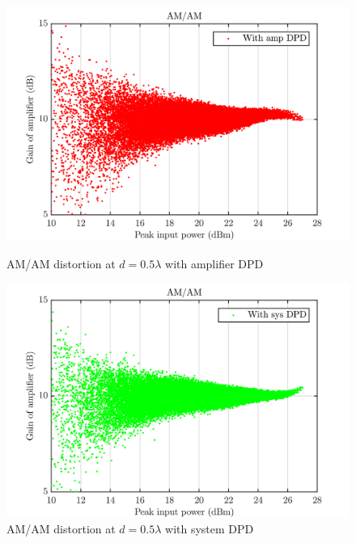 \begin{figure}[H]
  \centering
  \begin{minipage}[b]{0.5\textwidth}
	\includegraphics[scale = 0.5]{figures/measurement/cree/meas3/amam_amp_dpd_0p5.png}
	\caption{AM/AM distortion at $d = 0.5\lambda$ with amplifier DPD}	
    \label{fig:meas4_amam5_2}
  \end{minipage}
  \hfill
  \begin{minipage}[b]{0.4\textwidth}
	\includegraphics[scale = 0.5]{figures/measurement/cree/meas3/amam_sys_dpd_0p5.png}
	\caption{AM/AM distortion at $d = 0.5\lambda$ with system DPD}
    \label{fig:meas4_amam6_2}
  \end{minipage}
\end{figure}

